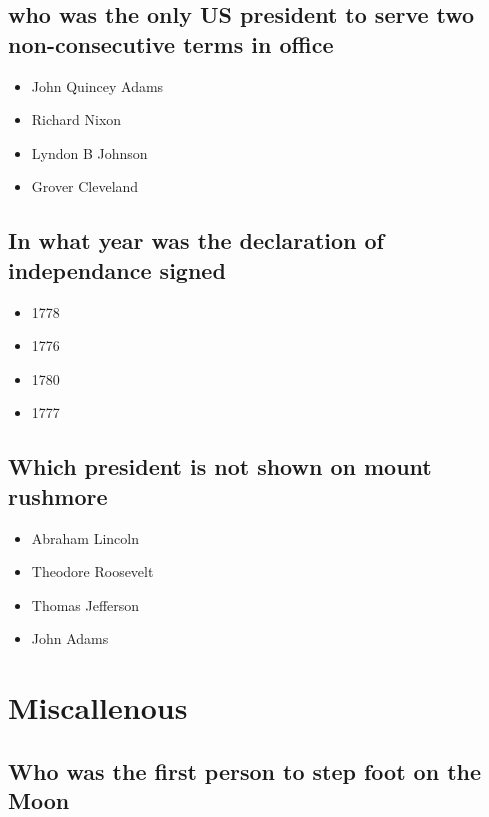 \documentclass{article}
\begin{document}
\subsection{who was the only US president to serve two non-consecutive terms in office}

\begin{itemize}
\item John Quincey Adams
\item Richard Nixon
\item Lyndon B Johnson
\item Grover Cleveland

\end{itemize}







\subsection{In what year was the declaration of independance signed}

\begin{itemize}
\item 1778
\item 1776
\item 1780
\item 1777

\end{itemize}




\subsection{Which president is not shown on mount rushmore}

\begin{itemize}
\item Abraham Lincoln
\item Theodore Roosevelt
\item Thomas Jefferson
\item John Adams

\end{itemize}



\section{Miscallenous}

\subsection{Who was the first person to step foot on the Moon}
\end{document}
